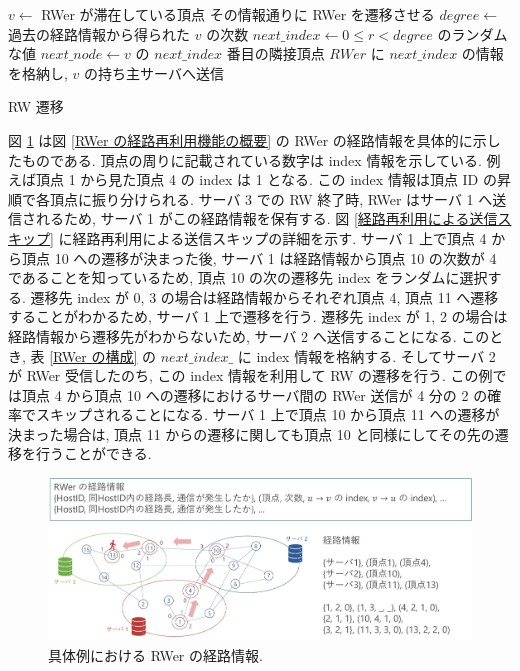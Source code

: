 \begin{algorithm}[t]
\DontPrintSemicolon
\nl     $v \leftarrow$ RWer が滞在している頂点\;
\nl     {} {
\nl         {} {
\nl             その情報通りに RWer を遷移させる\;}
\nl         {}}
\nl     {} {
\nl         $degree \leftarrow$ 過去の経路情報から得られた $v$ の次数\;
\nl         $next\_index \leftarrow 0 \leq r < degree$ のランダムな値\;
\nl         $next\_node \leftarrow v$ の $next\_index$ 番目の隣接頂点\;
\nl         {} {
\nl             $RWer$ に $next\_index$ の情報を格納し, $v$ の持ち主サーバへ送信\;}
\nl         {}}
\caption{{RW 遷移} \label{RW 遷移}}
\end{algorithm}

図 \ref{具体例における RWer の経路情報} は図 \ref{RWer の経路再利用機能の概要} の RWer の経路情報を具体的に示したものである. 頂点の周りに記載されている数字は index 情報を示している. 例えば頂点 1 から見た頂点 4 の index は 1 となる. この index 情報は頂点 ID の昇順で各頂点に振り分けられる. サーバ 3 での RW 終了時, RWer はサーバ 1 へ送信されるため, サーバ 1 がこの経路情報を保有する. 図 \ref{経路再利用による送信スキップ} に経路再利用による送信スキップの詳細を示す. サーバ 1 上で頂点 4 から頂点 10 への遷移が決まった後, サーバ 1 は経路情報から頂点 10 の次数が 4 であることを知っているため, 頂点 10 の次の遷移先 index をランダムに選択する. 遷移先 index が 0, 3 の場合は経路情報からそれぞれ頂点 4, 頂点 11 へ遷移することがわかるため, サーバ 1 上で遷移を行う. 遷移先 index が 1, 2 の場合は経路情報から遷移先がわからないため, サーバ 2 へ送信することになる. このとき, 表 \ref{RWer の構成} の $next\_index\_$ に index 情報を格納する. そしてサーバ 2 が RWer 受信したのち, この index 情報を利用して RW の遷移を行う. この例では頂点 4 から頂点 10 への遷移におけるサーバ間の RWer 送信が 4 分の 2 の確率でスキップされることになる. サーバ 1 上で頂点 10 から頂点 11 への遷移が決まった場合は, 頂点 11 からの遷移に関しても頂点 10 と同様にしてその先の遷移を行うことができる. 

\begin{figure}[t]
    \centering
    \includegraphics[scale=0.5]{figure/path_ex.pdf}
    \caption{具体例における RWer の経路情報.}
    \label{具体例における RWer の経路情報}
\end{figure}

